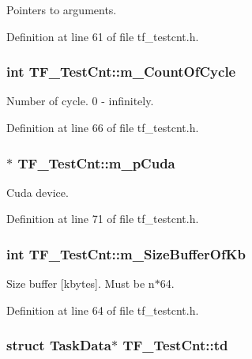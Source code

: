 Pointers to arguments. 

Definition at line 61 of file tf\_\-testcnt.h.\hypertarget{classTF__TestCnt_a70e774fb6d9ae7612e09435db2c181bf}{
\subsubsection[{m\_\-CountOfCycle}]{\setlength{\rightskip}{0pt plus 5cm}int {\bf TF\_\-TestCnt::m\_\-CountOfCycle}}}
\label{classTF__TestCnt_a70e774fb6d9ae7612e09435db2c181bf}


Number of cycle. 0 -\/ infinitely. 

Definition at line 66 of file tf\_\-testcnt.h.\hypertarget{classTF__TestCnt_ae3ae3864214526738718e0c7c81e915f}{
\subsubsection[{m\_\-pCuda}]{$\ast$ {\bf TF\_\-TestCnt::m\_\-pCuda}}}
\label{classTF__TestCnt_ae3ae3864214526738718e0c7c81e915f}


Cuda device. 

Definition at line 71 of file tf\_\-testcnt.h.\hypertarget{classTF__TestCnt_acbae8197757e11371fde750b576e06cc}{
\subsubsection[{m\_\-SizeBufferOfKb}]{\setlength{\rightskip}{0pt plus 5cm}int {\bf TF\_\-TestCnt::m\_\-SizeBufferOfKb}}}
\label{classTF__TestCnt_acbae8197757e11371fde750b576e06cc}


Size buffer \mbox{[}kbytes\mbox{]}. Must be n$\ast$64. 

Definition at line 64 of file tf\_\-testcnt.h.\hypertarget{classTF__TestCnt_ad07a631fa0915ea387e2877bf06ef7b2}{
\subsubsection[{td}]{\setlength{\rightskip}{0pt plus 5cm}struct {\bf TaskData}$\ast$ {\bf TF\_\-TestCnt::td}}}
\label{classTF__TestCnt_ad07a631fa0915ea387e2877bf06ef7b2}


